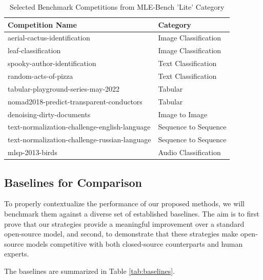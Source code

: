 \begin{table}[htbp]
\centering
\caption{Selected Benchmark Competitions from MLE-Bench 'Lite' Category}
\label{tab:competitions}
\begin{tabular}{ll}
\toprule
\textbf{Competition Name} & \textbf{Category} \\
\midrule
aerial-cactus-identification & Image Classification \\
leaf-classification & Image Classification \\
spooky-author-identification & Text Classification \\
random-acts-of-pizza & Text Classification \\
tabular-playground-series-may-2022 & Tabular \\
nomad2018-predict-transparent-conductors & Tabular \\
denoising-dirty-documents & Image to Image \\
text-normalization-challenge-english-language & Sequence to Sequence \\
text-normalization-challenge-russian-language & Sequence to Sequence \\
mlsp-2013-birds & Audio Classification \\ \hline
\end{tabular}
\end{table}

\subsection{Baselines for Comparison}

To properly contextualize the performance of our proposed methods, we will benchmark them against a diverse set of established baselines. The aim is to first prove that our strategies provide a meaningful improvement over a standard open-source model, and second, to demonstrate that these strategies make open-source models competitive with both closed-source counterparts and human experts.

The baselines are summarized in Table \ref{tab:baselines}.

